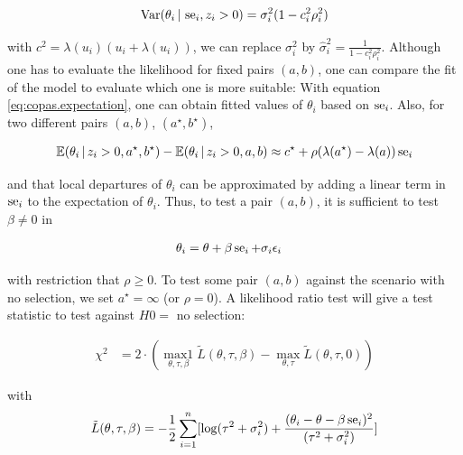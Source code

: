 \documentclass[11pt,a4paper,twoside]{book}\usepackage[]{graphicx}\usepackage[]{color}
\begin{document}
\begin{align}
\textrm{Var}(\theta_i\,\vert\, \operatorname{se}_i, z_i > 0) = \sigma_i^2 (1 - c_i^2\rho_i^2) \nonumber
\end{align}

with $c^2 = \lambda(u_i)(u_i + \lambda(u_i))$, we can replace $\sigma_i^2$ by $\hat{\sigma}_i^2 = \frac{1}{1-c_i^2\rho_i^2}$. Although one has to evaluate the likelihood for fixed pairs $(a,b)$, one can compare the fit of the model to evaluate which one is more suitable:
With equation \eqref{eq:copas.expectation}, one can obtain fitted values of $\theta_i$ based on $\operatorname{se}_i$. Also, for two different pairs $(a,b)$, $(a^\star, b^\star)$,

\begin{align}
\mathbb{E}(\theta_i\,\vert\, z_i > 0, a^\star, b^\star) - \mathbb{E}(\theta_i\,\vert\, z_i > 0, a, b) \approx c^\star + \rho(\lambda(a^\star) - \lambda(a))\operatorname{se}_i \nonumber
\end{align}

and that local departures of $\theta_i$ can be approximated by adding a linear term in $\operatorname{se}_i$ to the expectation of $\theta_i$. Thus, to test a pair $(a,b)$, it is sufficient to test $\beta \neq 0$ in

\begin{align}
\theta_i &= \theta + \beta \operatorname{se}_i + \sigma_i \epsilon_i \nonumber
\end{align}

with restriction that $\rho \geq 0$. To test some pair $(a,b)$ against the scenario with no selection, we set $a^\star = \infty$ (or $\rho = 0$). A likelihood ratio test will give a test statistic to test against $H0 =$ no selection:

\begin{align}
\chi^2 &= 2\cdot(\operatorname*{max1}_{\theta, \tau, \beta}\tilde{L}(\theta, \tau, \beta) - \operatorname*{max}_{\theta, \tau}\tilde{L}(\theta, \tau, 0)) \label{eq:copas.small.study}
\end{align}

with 
\begin{align}
\tilde{L}(\theta, \tau, \beta) = -\frac{1}{2}\sum_{i = 1}^n[\log(\tau^2 + \sigma_i^2) + \frac{(\theta_i - \theta - \beta \operatorname{se}_i)^2}{(\tau^2 + \sigma_i^2)}] \nonumber
\end{align}
\end{document}
